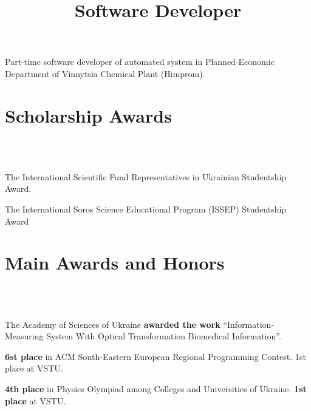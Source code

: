 \documentclass[10pt,overlapped,line]{res}
\newcommand{\mplace}[1]{\textbf{#1}}
\begin{document}
\begin{resume}
\title{Software Developer}
\begin{position}
Part-time software developer of automated system in
Planned-Economic Department of Vinnytsia Chemical Plant (Himprom).
\end{position}

\section{Scholarship Awards}
\begin{format}
  \\ 
  \body\\
\end{format}

\employer{} 
\begin{position}
 The International Scientific Fund Representatives in Ukrainian Studentship Award. 
\end{position}

\employer{} 
\begin{position}
 The International Soros Science Educational Program (ISSEP) Studentship Award
\end{position}


\section{Main Awards and Honors}
\begin{format}
   \\ 
  \body\\
\end{format}

\begin{position}
  The Academy of Sciences of Ukraine \mplace{awarded the work}
  ``Information-Measuring System With Optical Transformation
  Biomedical Information''.
\end{position}

\begin{position}
  \mplace{6st place} in ACM South-Eastern European Regional
  Programming Contest. 1st place at VSTU.
\end{position}

\begin{position}
  \mplace{4th place} in Physics Olympiad among Colleges and
  Universities of Ukraine. \mplace{1st place} at VSTU.
\end{position}


\end{resume}
\end{document}
